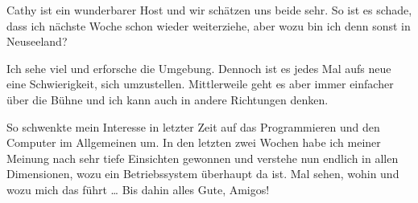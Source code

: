 Cathy ist ein wunderbarer Host und wir schätzen uns beide sehr. So ist
es schade, dass ich nächste Woche schon wieder weiterziehe, aber wozu
bin ich denn sonst in Neuseeland?

Ich sehe viel und erforsche die Umgebung. Dennoch ist es jedes Mal aufs
neue eine Schwierigkeit, sich umzustellen. Mittlerweile geht es aber
immer einfacher über die Bühne und ich kann auch in andere Richtungen
denken.

So schwenkte mein Interesse in letzter Zeit auf das Programmieren und
den Computer im Allgemeinen um. In den letzten zwei Wochen habe ich
meiner Meinung nach sehr tiefe Einsichten gewonnen und verstehe nun
endlich in allen Dimensionen, wozu ein Betriebssystem überhaupt da
ist.  Mal sehen, wohin und wozu mich das führt \ldots{} Bis dahin
alles Gute, Amigos!
